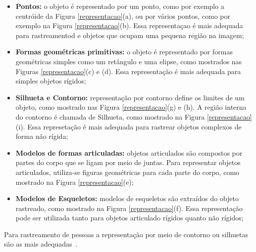 	\begin{itemize}
		\item \textbf{Pontos:} o objeto é representado por um ponto, como por exemplo a centróide da Figura \ref{representacao}(a), ou por vários pontos, como por exemplo na Figura \ref{representacao}(b). Essa representaçao é mais adequada para rastreamentod e objetos que ocupam uma pequena região na imagem;
		\item \textbf{Formas geométricas primitivas:} o objeto é representado por formas geométricas simples como um retângulo e uma elipse, como mostrados nas Figuras \ref{representacao}(c) e (d). Essa representação é mais adequada para simples objetos rígidos;
		\item \textbf{Silhueta e Contorno:} representação por contorno define os limites de um objeto, como mostrado nas Figura \ref{representacao}(g) e (h). A região interna do contorno é chamada de Silhueta, como mostrado na Figura \ref{representacao}(i). Essa represetação é mais adequada para rastrear objetos complexos de forma não rígida;
		\item \textbf{Modelos de formas articuladas:} objetos articulados são compostos por partes do corpo que se ligam por meio de juntas. Para representar objetos articulados, utiliza-se figuras geométricas para cada parte do corpo, como mostrado na Figura \ref{representacao}(e);
		\item \textbf{Modelos de Esqueletos:} modelos de esqueletos são extraídos do objeto rastreado, como mostrado na Figura \ref{representacao}(f). Essa representação pode ser utilizada tanto para objetos articulado rígidos quanto não rígidos;
	\end{itemize}

	Para rastreamento de pessoas a representação por meio de contorno ou silhuetas são as mais adequadas~\cite{yilmaz}.






























